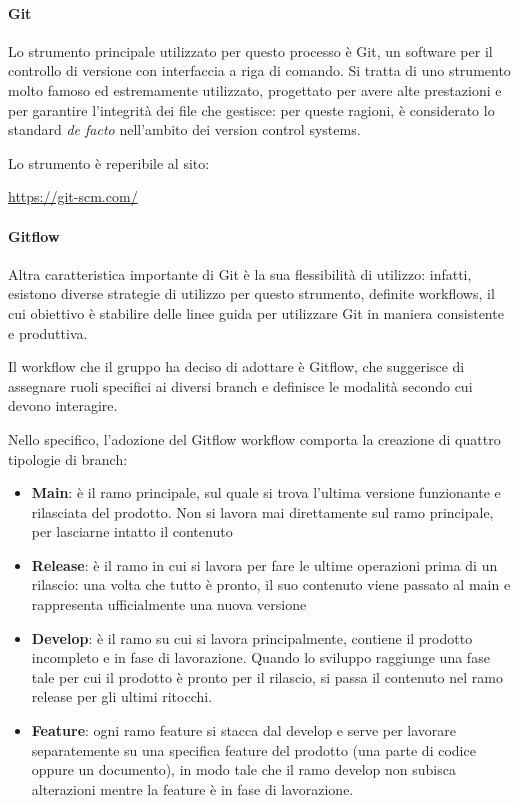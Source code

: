 \paragraph{Git}
Lo strumento principale utilizzato per questo processo è Git, un software per il controllo di versione con interfaccia a riga di comando. Si tratta di uno strumento molto famoso ed estremamente utilizzato, progettato per avere alte prestazioni e per garantire l'integrità dei file che gestisce: per queste ragioni, è considerato lo standard \textit{de facto} nell'ambito dei version control systems.
\par Lo strumento è reperibile al sito:
\begin{center}
    \url{https://git-scm.com/}
\end{center}
\paragraph{Gitflow}
Altra caratteristica importante di Git è la sua flessibilità di utilizzo: infatti, esistono diverse strategie di utilizzo per questo strumento, definite workflows, il cui obiettivo è stabilire delle linee guida per utilizzare Git in maniera consistente e produttiva.
\par Il workflow che il gruppo ha deciso di adottare è Gitflow, che suggerisce di assegnare ruoli specifici ai diversi branch e definisce le modalità secondo cui devono interagire.
\par Nello specifico, l'adozione del Gitflow workflow comporta la creazione di quattro tipologie di branch:
\begin{itemize}
    \item \textbf{Main}: è il ramo principale, sul quale si trova l'ultima versione funzionante e rilasciata del prodotto. Non si lavora mai direttamente sul ramo principale, per lasciarne intatto il contenuto
    \item \textbf{Release}: è il ramo in cui si lavora per fare le ultime operazioni prima di un rilascio: una volta che tutto è pronto, il suo contenuto viene passato al main e rappresenta ufficialmente una nuova versione
    \item \textbf{Develop}: è il ramo su cui si lavora principalmente, contiene il prodotto incompleto e in fase di lavorazione. Quando lo sviluppo raggiunge una fase tale per cui il prodotto è pronto per il rilascio, si passa il contenuto nel ramo release per gli ultimi ritocchi.
    \item \textbf{Feature}: ogni ramo feature si stacca dal develop e serve per lavorare separatemente su una specifica feature del prodotto (una parte di codice oppure un documento), in modo tale che il ramo develop non subisca alterazioni mentre la feature è in fase di lavorazione.
\end{itemize}
